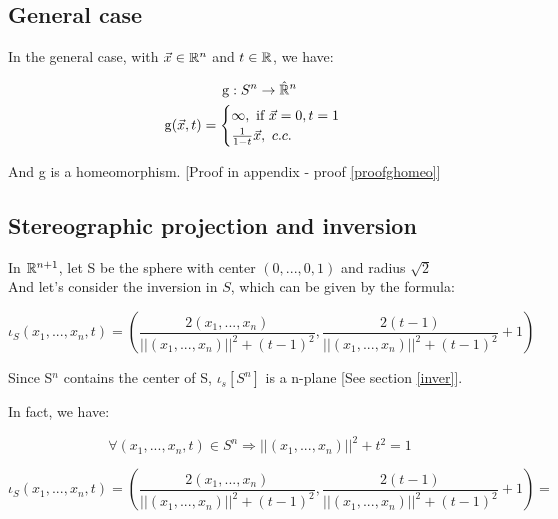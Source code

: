\subsection{General case} \label{projest}
In the general case, with $\vec{x} \in \mathbb{R}^{n}$ and $t \in \mathbb{R}$, we have:

\begin{gather*}
\operatorname{g} : S^n \rightarrow \hat{\mathbb{R}}^n \\
\operatorname{g}(\vec{x}, t) =
    \begin{cases}
        \infty, \text{ if }\vec{x} = 0, t = 1 \\
        \frac{1}{1 - t} \vec{x}, \mbox{ } c.c.
    \end{cases}
\end{gather*}

And g is a homeomorphism. [Proof in appendix - proof \ref{proofghomeo}]


\subsection{Stereographic projection and inversion}

In $\mathbb{R}^{n+1}$, let S be the sphere with center $(0, ..., 0, 1)$ and radius $\sqrt{2}$\\
And let's consider the inversion in $S$, which can be given by the formula:

\begin{equation*}
    \iota_{S}(x_1, ..., x_n, t) = \left( \frac{2(x_1, ..., x_n)}{||(x_1, ..., x_n)||^2 + (t-1)^2}, \frac{2(t-1)}{||(x_1, ..., x_n)||^2 + (t-1)^2} + 1 \right)
\end{equation*}

Since S$^n$ contains the center of S, $\iota_s[S^n]$ is a n-plane [See section \ref{inver}].

In fact, we have:

\begin{equation*}
    \forall (x_1, ..., x_n, t) \in S^n \Rightarrow ||(x_1, ..., x_n)||^2+t^2=1
\end{equation*}

\begin{equation*}
    \iota_{S}(x_1, ..., x_n, t) = \left( \frac{2(x_1, ..., x_n)}{||(x_1, ..., x_n)||^2 + (t-1)^2}, \frac{2(t-1)}{||(x_1, ..., x_n)||^2 + (t-1)^2} + 1 \right) =
\end{equation*}

